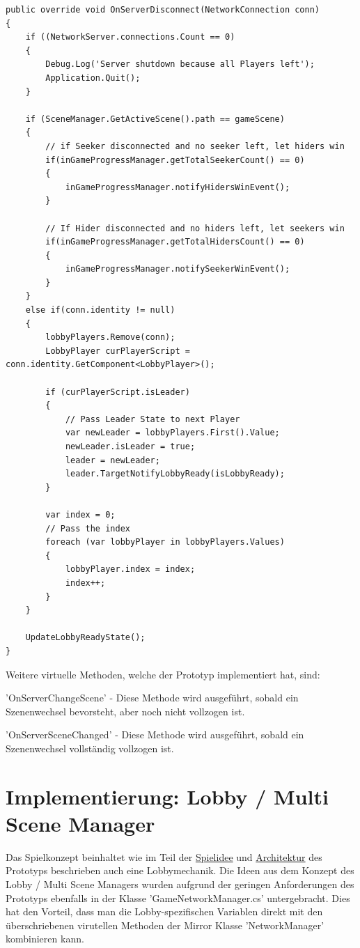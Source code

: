 \begin{lstlisting}[caption= GameNetworkManager.cs OnServerDisconnect()]
public override void OnServerDisconnect(NetworkConnection conn)
{
	if ((NetworkServer.connections.Count == 0)
	{
		Debug.Log('Server shutdown because all Players left');
		Application.Quit();
	}

	if (SceneManager.GetActiveScene().path == gameScene)
	{
		// if Seeker disconnected and no seeker left, let hiders win
		if(inGameProgressManager.getTotalSeekerCount() == 0)
		{
			inGameProgressManager.notifyHidersWinEvent();
		}
		
		// If Hider disconnected and no hiders left, let seekers win
		if(inGameProgressManager.getTotalHidersCount() == 0)
		{
			inGameProgressManager.notifySeekerWinEvent();
		}
	}
	else if(conn.identity != null)
	{
		lobbyPlayers.Remove(conn);
		LobbyPlayer curPlayerScript = conn.identity.GetComponent<LobbyPlayer>();
			
		if (curPlayerScript.isLeader)
		{
			// Pass Leader State to next Player
			var newLeader = lobbyPlayers.First().Value;
			newLeader.isLeader = true;
			leader = newLeader;
			leader.TargetNotifyLobbyReady(isLobbyReady);
		}
			
		var index = 0;
		// Pass the index
		foreach (var lobbyPlayer in lobbyPlayers.Values)
		{
			lobbyPlayer.index = index;
			index++;
		}
	}
		
	UpdateLobbyReadyState();
}
\end{lstlisting}

Weitere virtuelle Methoden, welche der Prototyp implementiert hat, sind:

'OnServerChangeScene' - Diese Methode wird ausgeführt, sobald ein Szenenwechsel bevorsteht, aber noch nicht vollzogen ist.

'OnServerSceneChanged' - Diese Methode wird ausgeführt, sobald ein Szenenwechsel vollständig vollzogen ist.

\section{Implementierung: Lobby / Multi Scene Manager}
\label{Lobby Manager Implementierung}

Das Spielkonzept beinhaltet wie im Teil der \hyperref[Spielidee]{Spielidee} und \hyperref[Architektur]{Architektur} des Prototyps beschrieben auch eine Lobbymechanik. Die Ideen aus dem Konzept des Lobby / Multi Scene Managers wurden aufgrund der geringen Anforderungen des Prototyps ebenfalls in der Klasse 'GameNetworkManager.cs' untergebracht. Dies hat den Vorteil, dass man die Lobby-spezifischen Variablen direkt mit den überschriebenen virutellen Methoden der Mirror Klasse 'NetworkManager' kombinieren kann.

